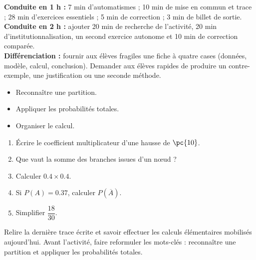 \ifmxteacher
\begin{method}
\textbf{Conduite en 1 h :} 7 min d'automatismes ; 10 min de mise en commun et trace ; 28 min d'exercices essentiels ; 5 min de correction ; 3 min de billet de sortie.\\
\textbf{Conduite en 2 h :} ajouter 20 min de recherche de l'activité, 20 min d'institutionnalisation, un second exercice autonome et 10 min de correction comparée.\\
\textbf{Différenciation :} fournir aux élèves fragiles une fiche à quatre cases (données, modèle, calcul, conclusion). Demander aux élèves rapides de produire un contre-exemple, une justification ou une seconde méthode.
\end{method}
\fi
{}
    \begin{objectives}\begin{itemize}\item Reconnaître une partition.\item Appliquer les probabilités totales.\item Organiser le calcul.\end{itemize}\end{objectives}
    \begin{fluency}\begin{enumerate}\item Écrire le coefficient multiplicateur d'une hausse de $\pc{10}$. \item Que vaut la somme des branches issues d'un nœud ? \item Calculer $\num{0,4}\times\num{0,4}$. \item Si $P(A)=\num{0,37}$, calculer $P(\overline A)$. \item Simplifier $\dfrac{18}{30}$. \end{enumerate}\end{fluency}
    \begin{prerequisites}Relire la dernière trace écrite et savoir effectuer les calculs élémentaires mobilisés aujourd'hui. Avant l'activité, faire reformuler les mots-clés : reconnaître une partition et appliquer les probabilités totales.\end{prerequisites}

